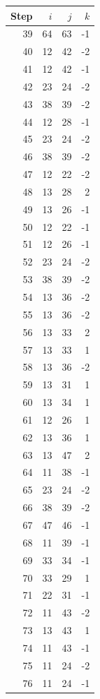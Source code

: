 \begin{center}
\hfill
\begin{minipage}[t]{.46\linewidth}\centering
\begin{tabular}{rrrr}
\toprule Step & $i$ & $j$ & $k$\\\midrule
39&64&63&-1\\
40&12&42&-2\\
41&12&42&-1\\
42&23&24&-2\\
43&38&39&-2\\
44&12&28&-1\\
45&23&24&-2\\
46&38&39&-2\\
47&12&22&-2\\
48&13&28&2\\
49&13&26&-1\\
50&12&22&-1\\
51&12&26&-1\\
52&23&24&-2\\
53&38&39&-2\\
54&13&36&-2\\
55&13&36&-2\\
56&13&33&2\\
57&13&33&1\\
58&13&36&-2\\
59&13&31&1\\
60&13&34&1\\
61&12&26&1\\
62&13&36&1\\
63&13&47&2\\
64&11&38&-1\\
65&23&24&-2\\
66&38&39&-2\\
67&47&46&-1\\
68&11&39&-1\\
69&33&34&-1\\
70&33&29&1\\
71&22&31&-1\\
72&11&43&-2\\
73&13&43&1\\
74&11&43&-1\\
75&11&24&-2\\
76&11&24&-1\\
\bottomrule\end{tabular}\end{minipage}
\end{center}
